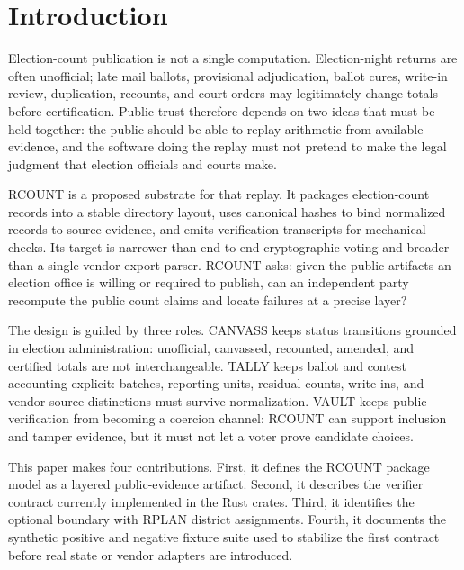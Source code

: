\section{Introduction}

Election-count publication is not a single computation. Election-night returns
are often unofficial; late mail ballots, provisional adjudication, ballot cures,
write-in review, duplication, recounts, and court orders may legitimately change
totals before certification. Public trust therefore depends on two ideas that
must be held together: the public should be able to replay arithmetic from
available evidence, and the software doing the replay must not pretend to make
the legal judgment that election officials and courts make.

RCOUNT is a proposed substrate for that replay. It packages election-count
records into a stable directory layout, uses canonical hashes to bind normalized
records to source evidence, and emits verification transcripts for mechanical
checks. Its target is narrower than end-to-end cryptographic voting and broader
than a single vendor export parser. RCOUNT asks: given the public artifacts an
election office is willing or required to publish, can an independent party
recompute the public count claims and locate failures at a precise layer?

The design is guided by three roles. CANVASS keeps status transitions grounded
in election administration: unofficial, canvassed, recounted, amended, and
certified totals are not interchangeable. TALLY keeps ballot and contest
accounting explicit: batches, reporting units, residual counts, write-ins, and
vendor source distinctions must survive normalization. VAULT keeps public
verification from becoming a coercion channel: RCOUNT can support inclusion and
tamper evidence, but it must not let a voter prove candidate choices.

This paper makes four contributions. First, it defines the RCOUNT package model
as a layered public-evidence artifact. Second, it describes the verifier
contract currently implemented in the Rust crates. Third, it identifies the
optional boundary with RPLAN district assignments. Fourth, it documents the
synthetic positive and negative fixture suite used to stabilize the first
contract before real state or vendor adapters are introduced.

